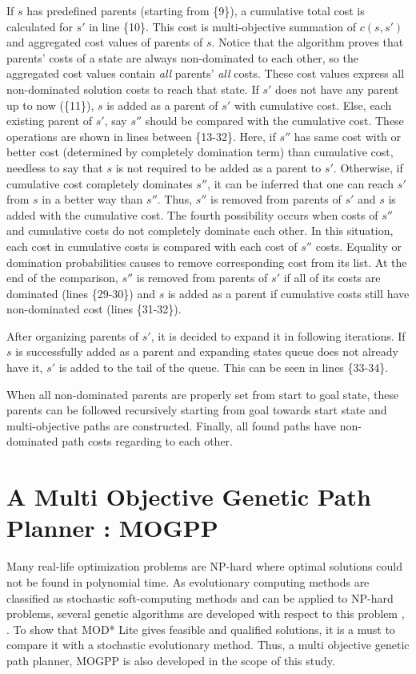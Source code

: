 If $s$ has predefined parents (starting from \{9\}), a cumulative total cost is calculated for $s'$ in line \{10\}. This cost is multi-objective summation of $c(s, s')$ and aggregated cost values of parents of $s$. Notice that the algorithm proves that parents' costs of a state are always non-dominated to each other, so the aggregated cost values contain \textit{all} parents' \textit{all} costs. These cost values express all non-dominated solution costs to reach that state. If $s'$ does not have any parent up to now (\{11\}), $s$ is added as a parent of $s'$ with cumulative cost. Else, each existing parent of $s'$, say $s''$ should be compared with the cumulative cost. These operations are shown in lines between \{13-32\}. Here, if $s''$ has same cost with or better cost (determined by completely domination term) than cumulative cost, needless to say that $s$ is not required to be added as a parent to $s'$. Otherwise, if cumulative cost completely dominates $s''$, it can be inferred that one can reach $s'$ from $s$ in a better way than $s''$. Thus, $s''$ is removed from parents of $s'$ and $s$ is added with the cumulative cost. The fourth possibility occurs when costs of $s''$ and cumulative costs do not completely dominate each other. In this situation, each cost in cumulative costs is compared with each cost of $s''$ costs. Equality or domination probabilities causes to remove corresponding cost from its list. At the end of the comparison, $s''$ is removed from parents of $s'$ if all of its costs are dominated (lines \{29-30\}) and $s$ is added as a parent if cumulative costs still have non-dominated cost (lines \{31-32\}).

After organizing parents of $s'$, it is decided to expand it in following iterations. If $s$ is successfully added as a parent and expanding states queue does not already have it, $s'$ is added to the tail of the queue. This can be seen in lines \{33-34\}.

When all non-dominated parents are properly set from start to goal state, these parents can be followed recursively starting from goal towards start state and multi-objective paths are constructed. Finally, all found paths have non-dominated path costs regarding to each other.

\section{A Multi Objective Genetic Path Planner : MOGPP}

Many real-life optimization problems are NP-hard where optimal solutions could not be found in polynomial time. As evolutionary computing methods are classified as stochastic soft-computing methods and can be applied to NP-hard problems, several genetic algorithms are developed with respect to this problem \cite{Pangilinan}, \cite{Peng_Xu_Zhang:2011}. To show that MOD* Lite gives feasible and qualified solutions, it is a must to compare it with a stochastic evolutionary method. Thus, a multi objective genetic path planner, MOGPP is also developed in the scope of this study.

